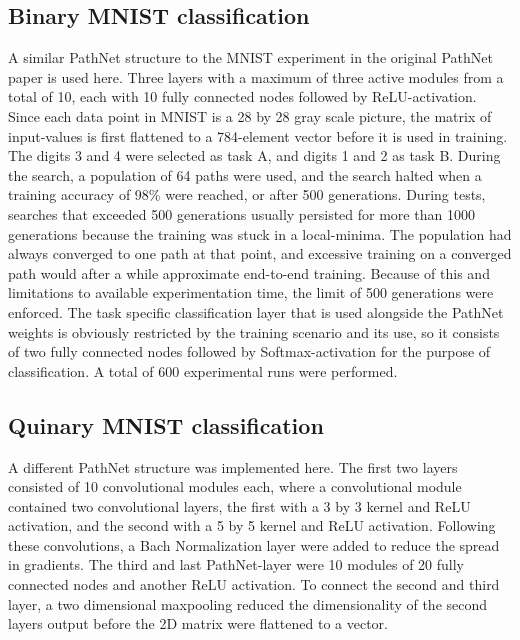 

\subsection{Binary MNIST classification}
A similar PathNet structure to the MNIST experiment in the original PathNet paper is used here. 
Three layers with a maximum of three active modules from a total of 10, each with 10 fully connected nodes followed by ReLU-activation. Since each data point in MNIST is a 28 by 28 gray scale picture, the matrix of input-values is first flattened to a 784-element vector before it is used in training. The digits 3 and 4 were selected as task A, and digits 1 and 2 as task B. 
During the search, a population of 64 paths were used, and the search halted when a training accuracy of 98\% were reached, or after 500 generations. During tests, searches that exceeded 500 generations usually persisted for more than 1000 generations because the training was stuck in a local-minima. The population had always converged to one path at that point, and excessive training on a converged path would after a while approximate end-to-end training. Because of this and limitations to available experimentation time, the limit of 500 generations were enforced. The task specific classification layer that is used alongside the PathNet weights is obviously restricted by the training scenario and its use, so it consists of two fully connected nodes followed by Softmax-activation for the purpose of classification.
A total of 600 experimental runs were performed.

\subsection{Quinary MNIST classification}
A different PathNet structure was implemented here. The first two layers consisted of 10 convolutional modules each, where a convolutional module contained two convolutional layers, the first with a 3 by 3 kernel and ReLU activation, and the second with a 5 by 5 kernel and ReLU activation. Following these convolutions, a Bach Normalization layer were added to reduce the spread in gradients. The third and last PathNet-layer were 10 modules of 20 fully connected nodes and another ReLU activation. To connect the second and third layer, a two dimensional maxpooling reduced the dimensionality of the second layers output before the 2D matrix were flattened to a vector.   


